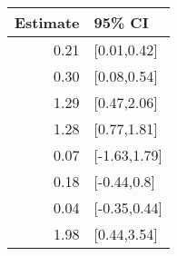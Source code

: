 \begin{tabular}{rl}
  \hline
Estimate & 95\% CI \\ 
  \hline
0.21 & [0.01,0.42] \\ 
  0.30 & [0.08,0.54] \\ 
  1.29 & [0.47,2.06] \\ 
  1.28 & [0.77,1.81] \\ 
  0.07 & [-1.63,1.79] \\ 
  0.18 & [-0.44,0.8] \\ 
  0.04 & [-0.35,0.44] \\ 
  1.98 & [0.44,3.54] \\ 
   \hline
\end{tabular}

